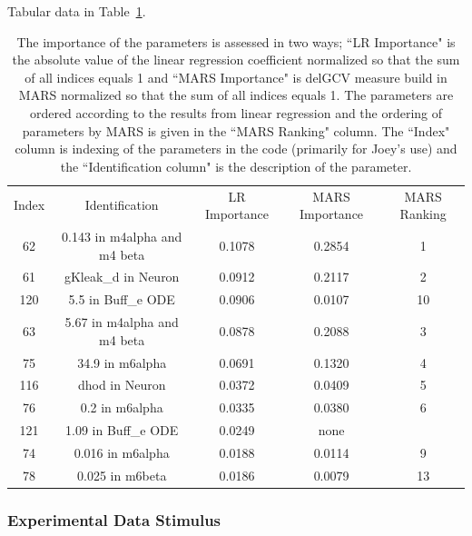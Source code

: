 \documentclass[12pt]{article}
\numberwithin{equation}{section}
\begin{document}
Tabular data in Table~\ref{qoi_K_ECS_Mean_rec}.

\begin{table}[h]
\centering
\begin{tabular}{ccccc}
Index & Identification & LR Importance & MARS Importance & MARS Ranking \\
62 & 0.143 in m4alpha and m4 beta &  0.1078 & 0.2854 & 1\\
61 & gKleak\_d in Neuron & 0.0912 & 0.2117 & 2\\
120 & 5.5 in Buff\_e ODE & 0.0906 & 0.0107 & 10\\
63 &   5.67 in m4alpha and m4 beta & 0.0878 & 0.2088 & 3\\
75 & 34.9 in m6alpha & 0.0691 & 0.1320 & 4\\
116 & dhod in Neuron & 0.0372 & 0.0409 & 5\\
76 & 0.2 in m6alpha & 0.0335 & 0.0380 & 6\\
121 & 1.09 in Buff\_e ODE & 0.0249 & none & \\
74 & 0.016 in m6alpha & 0.0188 & 0.0114 & 9\\
78 & 0.025 in m6beta & 0.0186 & 0.0079 & 13\\
\end{tabular}
\caption{The importance of the parameters is assessed in two ways; ``LR Importance" is the absolute value of the linear regression coefficient normalized so that the sum of all indices equals 1 and ``MARS Importance" is delGCV measure build in MARS normalized so that the sum of all indices equals 1. The parameters are ordered according to the results from linear regression and the ordering of parameters by MARS is given in the ``MARS Ranking" column. The ``Index" column is indexing of the parameters in the code (primarily for Joey's use) and the ``Identification column" is the description of the parameter.}
\label{qoi_K_ECS_Mean_rec}
\end{table}

\newpage

\subsubsection{Experimental Data Stimulus}
\end{document}

